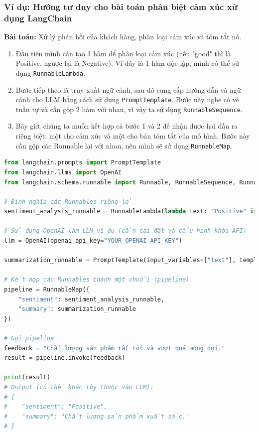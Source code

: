 \documentclass[11pt]{article}
\begin{document}
\subsubsection*{Ví dụ: Hướng tư duy cho bài toán phân biệt cảm xúc xử dụng LangChain}
\begin{boxC}
    \textbf{Bài toán:} Xử lý phản hồi của khách hàng, phân loại cảm xúc và tóm tắt nó.
    \begin{enumerate}
        \item Đầu tiên mình cần tạo 1 hàm dể phân loại cảm xúc (nếu "good" thì là Positive, ngược lại là Negative). Vì đây là 1 hàm độc lập, mình có thể sử dụng \texttt{RunnableLambda}.
        \item Bước tiếp theo là truy xuất ngữ cảnh, sau đó cung cấp hướng dẫn và ngữ cảnh cho LLM bằng cách sử dụng \texttt{PromptTemplate}. Bước này nghe có vẻ tuần tự và cần gộp 2 hàm với nhau, vì vậy ta sử dụng \texttt{RunnableSequence}.
        \item Bây giờ, chúng ta muốn kết hợp cả bước 1 và 2 để nhận được hai đầu ra riêng biệt: một cho cảm xúc và một cho bản tóm tắt của mô hình. Bước này cần gộp các Runnable lại với nhau, nên mình sẽ sử dụng \texttt{RunnableMap}.
    \end{enumerate}
    \begin{lstlisting}[language=Python, caption=Ví dụ về quy trình làm việc kết hợp các Runnable]
from langchain.prompts import PromptTemplate
from langchain.llms import OpenAI
from langchain.schema.runnable import Runnable, RunnableSequence, RunnableMap, RunnableLambda

# Định nghĩa các Runnables riêng lẻ
sentiment_analysis_runnable = RunnableLambda(lambda text: "Positive" if "good" in text.lower() else "Negative")

# Sử dụng OpenAI làm LLM ví dụ (cần cài đặt và cấu hình khóa API)
llm = OpenAI(openai_api_key="YOUR_OPENAI_API_KEY")

summarization_runnable = PromptTemplate(input_variables=["text"], template="Tóm tắt đoạn văn này: {text}") | llm # | đại diện cho RunnableSequence

# Kết hợp các Runnables thành một chuỗi (pipeline)
pipeline = RunnableMap({
    "sentiment": sentiment_analysis_runnable,
    "summary": summarization_runnable
})

# Gọi pipeline
feedback = "Chất lượng sản phẩm rất tốt và vượt quá mong đợi."
result = pipeline.invoke(feedback)

print(result)
# Output (có thể khác tùy thuộc vào LLM):
# {
#    "sentiment": "Positive",
#    "summary": "Chất lượng sản phẩm xuất sắc."
# }
    \end{lstlisting}
\end{boxC}
\end{document}
